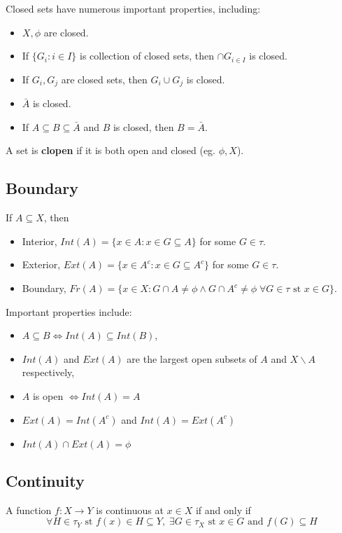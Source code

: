 \documentclass{article}
\begin{document}
Closed sets have numerous important properties, including:
\begin{itemize}
	\item $X, \phi$ are closed.
	\item If $\{G_i: i \in I\}$ is collection of closed sets, then $\cap G_{i \in I}$ is closed.
	\item If $G_i,  G_j$ are closed sets, then $G_i \cup G_j$ is closed.
	\item $\bar{A}$ is closed.
	\item If $A \subseteq B \subseteq \bar{A}$ and $B$ is closed, then $B = \bar{A}$.
\end{itemize}

A set is \textbf{clopen} if it is both open and closed  (eg. $\phi, X$). 

\subsection{Boundary}

If $A \subseteq X$, then 
\begin{itemize}
	\item Interior, $Int(A) = \{x \in A: x \in G \subseteq A\}$ for some $G \in \tau$.
	\item Exterior, $Ext(A) = \{x \in A^c: x \in G \subseteq A^c\}$ for some $G \in \tau$.
	\item Boundary, $Fr(A) = \{x \in X: G \cap A \not= \phi \wedge G \cap A^c \not= \phi \; \forall G \in \tau \text{ st } x \in G\}$.
\end{itemize}

Important properties include:
\begin{itemize}
	\item $A \subseteq B \iff Int(A) \subseteq Int(B)$,
	\item $Int(A)$ and $Ext(A)$ are the largest open subsets of $A$ and $X\backslash A$ respectively,
	\item $A$ is open $\iff Int(A) = A$
	\item $Ext(A) = Int(A^c)$ and $Int(A) = Ext(A^c)$
	\item $Int(A) \cap Ext(A) = \phi$
\end{itemize}

\subsection{Continuity}

A function $f: X \rightarrow Y$ is continuous at $x \in X$ if and only if
$$\forall H \in \tau_Y \text{ st } f(x) \in H \subseteq Y, \; \exists G \in \tau_X \text{ st } x \in G \text{ and } f(G) \subseteq H$$
\end{document}

